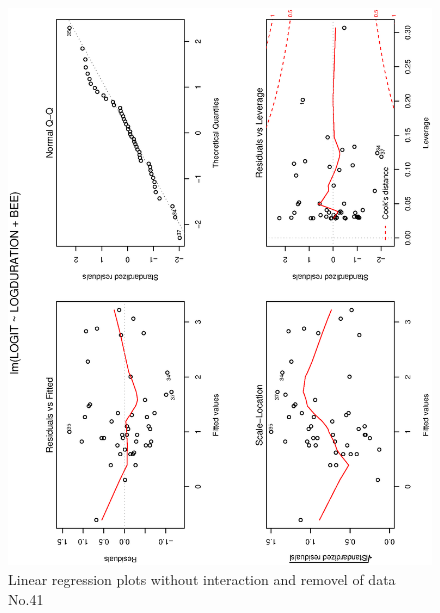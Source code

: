 \documentclass[a4paper,10pt]{article}
\begin{document}
\begin{figure}
\includegraphics[angle=-90, width=1\textwidth]{figures/math650_hw7_fig7.eps}
\caption{Linear regression plots without interaction and removel of data No.41}\label{f7}
\end{figure}
\end{document}

